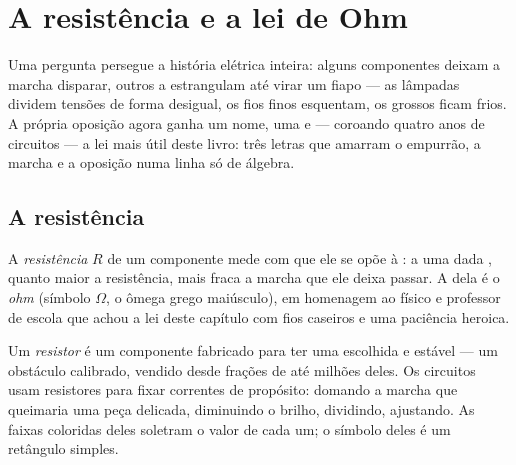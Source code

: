 \chapter{A resistência e a lei de Ohm}\label{ch:g8:ohms-law}

Uma pergunta persegue a história elétrica inteira: alguns
componentes deixam a marcha disparar, outros a estrangulam até virar
um fiapo --- as lâmpadas dividem tensões de forma desigual, os fios
finos esquentam, os grossos ficam frios. A própria oposição agora
ganha um nome, uma  e --- coroando quatro anos de circuitos ---
a lei mais útil deste livro: três letras que amarram o empurrão, a
marcha e a oposição numa linha só de álgebra.

\section{A resistência}

\begin{definition}[Resistência]\label{def:g8:ohms-law:resistance}
A \emph{resistência} $R$ de um componente mede com
que  ele se opõe à : a uma dada , quanto
maior a resistência, mais fraca a marcha que ele deixa passar. A
 dela é o \emph{ohm} (símbolo $\Omega$, o ômega
grego maiúsculo), em homenagem ao físico e professor de escola que
achou a lei deste capítulo com fios caseiros e uma paciência heroica.
\end{definition}

\begin{definition}[Resistor]\label{def:g8:ohms-law:resistor}
Um \emph{resistor} é um componente fabricado para ter
uma  escolhida e estável --- um obstáculo calibrado,
vendido desde frações de  até milhões deles. Os circuitos usam
resistores para fixar correntes de propósito: domando a marcha que
queimaria uma peça delicada, diminuindo o brilho, dividindo,
ajustando. As faixas coloridas deles soletram o valor de cada um; o
símbolo deles é um retângulo simples.
\end{definition}

